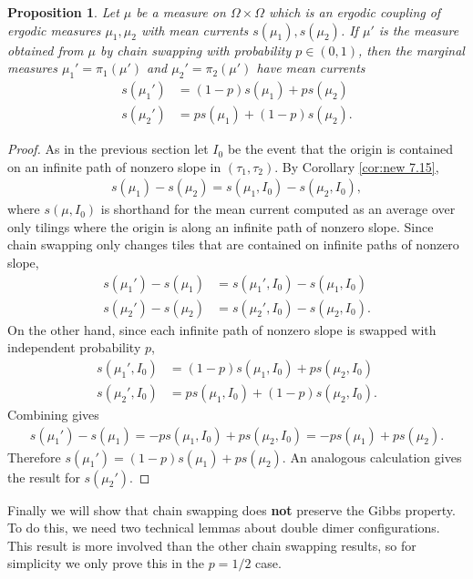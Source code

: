 \documentclass[11pt]{article}
\newtheorem{prop}[thm]{Proposition}
\theoremstyle{remark}
\theoremstyle{definition}
\begin{document}
\begin{prop}\label{prop: coupling swap mean current}
	Let $\mu$ be a measure on $\Omega\times \Omega$ which is an ergodic coupling of ergodic measures $\mu_1,\mu_2$ with mean currents $s(\mu_1),s(\mu_2)$. If $\mu'$ is the measure obtained from $\mu$ by chain swapping with probability $p\in(0,1)$, then the marginal measures $\mu_1'=\pi_1(\mu')$ and $\mu_2'=\pi_2(\mu')$ have mean currents
	\begin{align*}
	    s(\mu_1') &= (1-p)s(\mu_1) + p s(\mu_2)\\
     s(\mu_2') &= p s(\mu_1) + (1-p)s(\mu_2).
	\end{align*}
	\end{prop}
\begin{proof}
As in the previous section let $I_0$ be the event that the origin is contained on an infinite path of nonzero slope in $(\tau_1,\tau_2)$. By Corollary \ref{cor:new 7.15},
    \begin{align*}
        s(\mu_1) - s(\mu_2) = s(\mu_1,I_0) - s(\mu_2,I_0),
    \end{align*}
    where $s(\mu,I_0)$ is shorthand for the mean current computed as an average over only tilings where the origin is along an infinite path of nonzero slope. Since chain swapping only changes tiles that are contained on infinite paths of nonzero slope,
   \begin{align*}
       s(\mu_1') - s(\mu_1) &= s(\mu_1', I_0) - s(\mu_1, I_0)\\
       s(\mu_2') - s(\mu_2) &= s(\mu_2', I_0) - s(\mu_2, I_0).
   \end{align*}
    On the other hand, since each infinite path of nonzero slope is swapped with independent probability $p$, 
    \begin{align*}
        s(\mu_1', I_0) &= (1-p) s(\mu_1,I_0) + p s(\mu_2,I_0)\\
        s(\mu_2',I_0) &= p s(\mu_1,I_0) + (1-p) s(\mu_2,I_0).
    \end{align*}
    Combining gives
    \begin{align*}
        s(\mu_1') - s(\mu_1) = -p s(\mu_1,I_0) + p s(\mu_2,I_0) = -p s(\mu_1) + ps(\mu_2). 
    \end{align*}
    Therefore $s(\mu_1') = (1-p) s(\mu_1) +p s(\mu_2)$. An analogous calculation gives the result for $s(\mu_2')$.
\end{proof}


Finally we will show that chain swapping does {\textbf{not}} preserve the Gibbs property. To do this, we need two technical lemmas about double dimer configurations. This result is more involved than the other chain swapping results, so for simplicity we only prove this in the $p=1/2$ case. 
\end{document}
